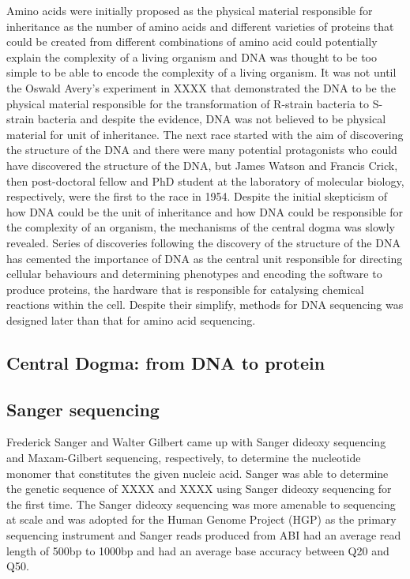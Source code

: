 Amino acids were initially proposed as the physical material responsible for inheritance as the number of amino acids and different varieties of proteins that could be created from different combinations of amino acid could potentially explain the complexity of a living organism and DNA was thought to be too simple to be able to encode the complexity of a living organism. It was not until the Oswald Avery's experiment in XXXX that demonstrated the DNA to be the physical material responsible for the transformation of R-strain bacteria to S-strain bacteria and despite the evidence, DNA was not believed to be physical material for unit of inheritance. The next race started with the aim of discovering the structure of the DNA and there were many potential protagonists who could have discovered the structure of the DNA, but James Watson and Francis Crick, then post-doctoral fellow and PhD student at the laboratory of molecular biology, respectively, were the first to the race in 1954\cite{}. Despite the initial skepticism of how DNA could be the unit of inheritance and how DNA could be responsible for the complexity of an organism, the mechanisms of the central dogma was slowly revealed. Series of discoveries following the discovery of the structure of the DNA has cemented the importance of DNA as the central unit responsible for directing cellular behaviours and determining phenotypes and encoding the software to produce proteins, the hardware that is responsible for catalysing chemical reactions within the cell. Despite their simplify, methods for DNA sequencing was designed later than that for amino acid sequencing. 

\subsection{Central Dogma: from DNA to protein}

\subsection{Sanger sequencing}

Frederick Sanger and Walter Gilbert came up with Sanger dideoxy sequencing and Maxam-Gilbert sequencing, respectively, to determine the nucleotide monomer that constitutes the given nucleic acid. Sanger was able to determine the genetic sequence of XXXX and XXXX using Sanger dideoxy sequencing for the first time. The Sanger dideoxy sequencing was more amenable to sequencing at scale and was adopted for the Human Genome Project (HGP) as the primary sequencing instrument and Sanger reads produced from ABI had an average read length of 500bp to 1000bp and had an average base accuracy between Q20 and Q50. 

